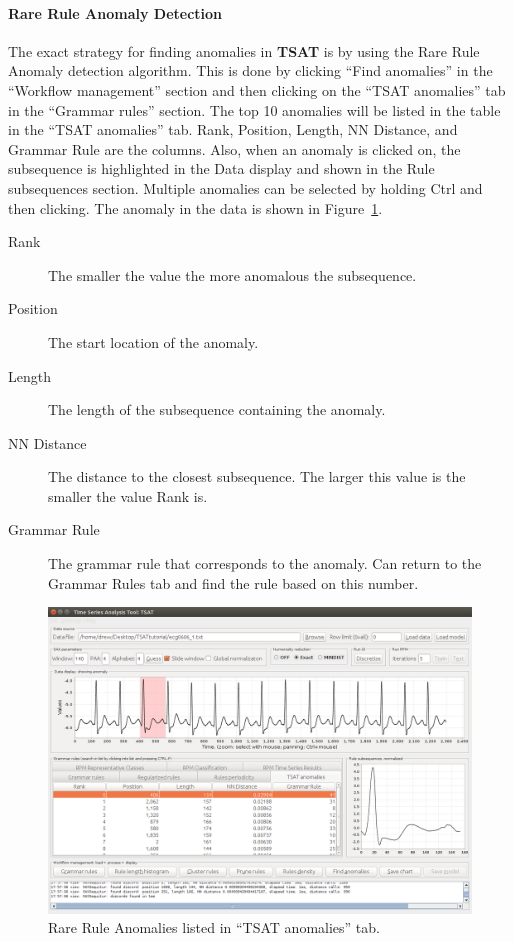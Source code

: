 \documentclass[titlepage, letterpaper, 12pt]{article}
\newcommand\TSAT{\textbf{TSAT}}
\begin{document}
\paragraph{Rare Rule Anomaly Detection}

The exact strategy for finding anomalies in {\TSAT} is by using the Rare Rule Anomaly detection algorithm.  This is done by clicking ``Find anomalies'' in the ``Workflow management'' section and then clicking on the ``TSAT anomalies'' tab in the ``Grammar rules'' section.  The top 10 anomalies will be listed in the table in the ``TSAT anomalies'' tab.  Rank, Position, Length, NN Distance, and Grammar Rule are the columns.  Also, when an anomaly is clicked on, the subsequence is highlighted in the Data display and shown in the Rule subsequences section.  Multiple anomalies can be selected by holding Ctrl and then clicking.  The anomaly in the data is shown in Figure~\ref{fig:rraresult}.

\begin{description}
	\item[Rank] The smaller the value the more anomalous the subsequence.
	\item[Position] The start location of the anomaly.
	\item[Length] The length of the subsequence containing the anomaly.
	\item[NN Distance] The distance to the closest subsequence.  The larger this value is the smaller the value Rank is.
	\item[Grammar Rule] The grammar rule that corresponds to the anomaly.  Can return to the Grammar Rules tab and find the rule based on this number.
\end{description}

\begin{figure}[H]
	\centering
	\includegraphics[width=\textwidth]{pictures/motifguide/RRAResult}
	\caption{Rare Rule Anomalies listed in ``TSAT anomalies'' tab.}
	\label{fig:rraresult}
\end{figure}
\end{document}
